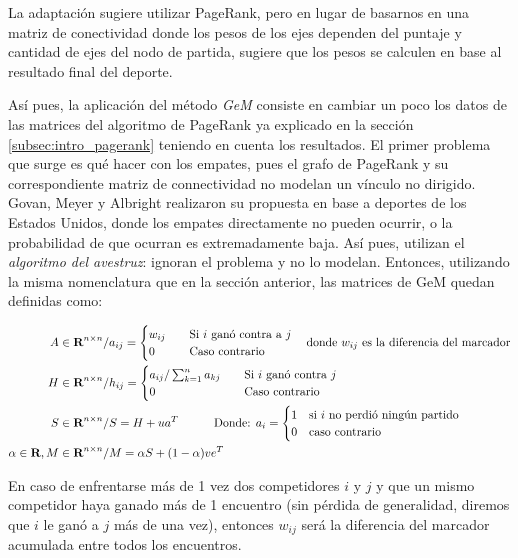 \par La adaptaci\'on sugiere utilizar PageRank, pero en lugar de basarnos en una
matriz de conectividad donde los pesos de los ejes dependen del puntaje y
cantidad de ejes del nodo de partida, sugiere que los pesos se calculen en base
al resultado final del deporte.

\par As\'i pues, la aplicaci\'on del m\'etodo \emph{GeM} consiste en cambiar un
poco los datos de las matrices del algoritmo de PageRank ya explicado en la
secci\'on \ref{subsec:intro_pagerank} teniendo en cuenta los resultados. El
primer problema que surge es qué hacer con los empates, pues el grafo de
PageRank y su correspondiente matriz de connectividad no modelan un v\'inculo no
dirigido. Govan, Meyer y Albright realizaron su propuesta en base a deportes de
los Estados Unidos, donde los empates directamente no pueden ocurrir, o la
probabilidad de que ocurran es extremadamente baja. As\'i pues, utilizan el
\emph{algoritmo del avestruz}: ignoran el problema y no lo modelan. Entonces,
utilizando la misma nomenclatura que en la secci\'on anterior, las matrices de
GeM quedan definidas como:

\begin{align}
    A\in\real^{n\times n} /& a_{ij} = \begin{cases}
        w_{ij}\quad&\text{Si $i$ gan\'o contra a $j$}\\
        0\quad&\text{Caso contrario}
    \end{cases}\quad\text{donde $w_{ij}$ es la diferencia del marcador}\\
%
    H\in\real^{n\times n} /& h_{ij} = \begin{cases}
        a_{ij}/\sum_{k=1}^n a_{kj}\quad&\text{Si $i$ gan\'o contra $j$}\\
        0\quad&\text{Caso contrario}
    \end{cases}\\
%
    S\in\real^{n\times n} /& S = H + ua^T \quad\quad\quad
        \text{Donde: } a_i =
        \begin{cases}
            1 &\text{si $i$ no perdi\'o ning\'un partido}\\
            0 &\text{caso contrario}
        \end{cases}\\
%
    \alpha\in\real, M\in\real^{n\times n} /& M = \alpha S + (1-\alpha)ve^T
\end{align}

\par En caso de enfrentarse m\'as de 1 vez dos competidores $i$ y $j$ y que un
mismo competidor haya ganado m\'as de 1 encuentro (sin p\'erdida de generalidad,
diremos que $i$ le gan\'o a $j$ m\'as de una vez), entonces $w_{ij}$ ser\'a la
diferencia del marcador acumulada entre todos los encuentros.

